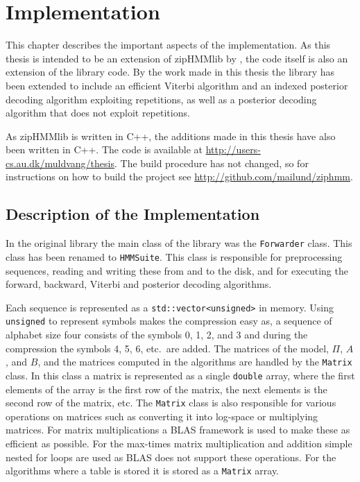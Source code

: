 
\chapter{Implementation}
\label{cha:implementation}

This chapter describes the important aspects of the implementation. As this
thesis is intended to be an extension of zipHMMlib by \citet{sand2013ziphmmlib},
the code itself is also an extension of the library code. By the work made in
this thesis the library has been extended to include an efficient Viterbi
algorithm and an indexed posterior decoding algorithm exploiting
repetitions, as well as a posterior decoding algorithm that does not
exploit repetitions.

As zipHMMlib is written in C++, the additions made in this thesis have also
been written in C++. The code is available at
\url{http://users-cs.au.dk/muldvang/thesis}. The build procedure has not
changed, so for instructions on how to build the project see
\url{http://github.com/mailund/ziphmm}.

\section{Description of the Implementation}
\label{sec:descr-impl}

In the original library the main class of the library was the
\texttt{Forwarder} class.  This class has been renamed to \texttt{HMMSuite}.
This class is responsible for preprocessing sequences, reading and writing
these from and to the disk, and for executing the forward, backward, Viterbi
and posterior decoding algorithms.

Each sequence is represented as a \texttt{std::vector<unsigned>} in memory.
Using \texttt{unsigned} to represent symbols makes the compression easy as, a
sequence of alphabet size four consists of the symbols 0, 1, 2, and 3 and
during the compression the symbols 4, 5, 6, etc.\ are added. The matrices of
the model, $\Pi$, $A$, and $B$, and the matrices computed in the algorithms are
handled by the \texttt{Matrix} class. In this class a matrix is represented as
a single \texttt{double} array, where the first elements of the array is the first
row of the matrix, the next elements is the second row of the matrix, etc. The
\texttt{Matrix} class is also responsible for various operations on matrices
such as converting it into log-space or multiplying matrices. For matrix
multiplications a BLAS framework is used to make these as efficient as
possible. For the max-times matrix multiplication and addition simple nested
for loops are used as BLAS does not support these operations. For the
algorithms where a table is stored it is stored as a \texttt{Matrix} array.

